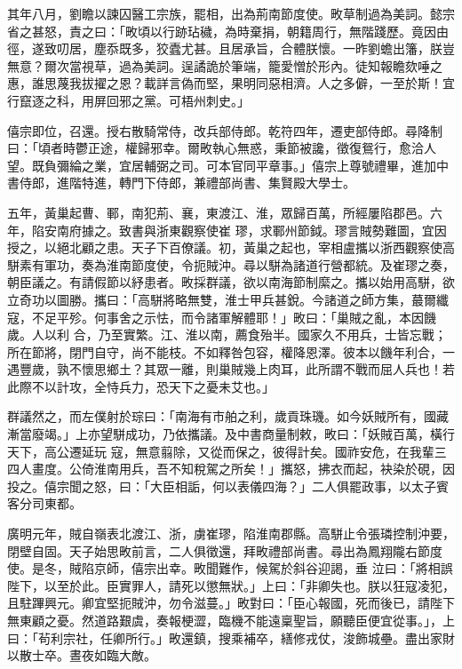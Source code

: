 \begin{pinyinscope}
 其年八月，劉瞻以諫囚醫工宗族，罷相，出為荊南節度使。畋草制過為美詞。懿宗省之甚怒，責之曰：「畋頃以行跡玷穢，為時棄捐，朝籍周行，無階踐歷。竟因由徑，遂致叨居，塵忝既多，狡蠹尤甚。且居承旨，合體朕懷。一昨劉蟾出籓，朕豈無意？爾次當視草，過為美詞。逞譎詭於筆端，籠愛憎於形內。徒知報瞻欬唾之惠，誰思蔑我拔擢之恩？載詳言偽而堅，果明同惡相濟。人之多僻，一至於斯！宜
 行竄逐之科，用屏回邪之黨。可梧州刺史。」



 僖宗即位，召還。授右散騎常侍，改兵部侍郎。乾符四年，遷吏部侍郎。尋降制曰：「頃者時鬱正途，權歸邪幸。爾畋執心無惑，秉節被讒，徵復鴛行，愈洽人望。既負彌綸之業，宜居輔弼之司。可本官同平章事。」僖宗上尊號禮畢，進加中書侍郎，進階特進，轉門下侍郎，兼禮部尚書、集賢殿大學士。



 五年，黃巢起曹、鄆，南犯荊、襄，東渡江、淮，眾歸百萬，所經屢陷郡邑。六年，陷安南府據之。致書與浙東觀察使崔
 璆，求鄆州節鉞。璆言賊勢難圖，宜因授之，以絕北顧之患。天子下百僚議。初，黃巢之起也，宰相盧攜以浙西觀察使高駢素有軍功，奏為淮南節度使，令扼賊沖。尋以駢為諸道行營都統。及崔璆之奏，朝臣議之。有請假節以紓患者。畋採群議，欲以南海節制縻之。攜以始用高駢，欲立奇功以圖勝。攜曰：「高駢將略無雙，淮士甲兵甚銳。今諸道之師方集，蕞爾纖寇，不足平殄。何事舍之示怯，而令諸軍解體耶！」畋曰：「巢賊之亂，本因饑歲。人以利
 合，乃至實繁。江、淮以南，薦食殆半。國家久不用兵，士皆忘戰；所在節將，閉門自守，尚不能枝。不如釋咎包容，權降恩澤。彼本以饑年利合，一遇豐歲，孰不懷思鄉土？其眾一離，則巢賊幾上肉耳，此所謂不戰而屈人兵也！若此際不以計攻，全恃兵力，恐天下之憂未艾也。」



 群議然之，而左僕射於琮曰：「南海有市舶之利，歲貢珠璣。如今妖賊所有，國藏漸當廢竭。」上亦望駢成功，乃依攜議。及中書商量制敕，畋曰：「妖賊百萬，橫行天下，高公遷延玩
 寇，無意翦除，又從而保之，彼得計矣。國祚安危，在我輩三四人畫度。公倚淮南用兵，吾不知稅駕之所矣！」攜怒，拂衣而起，袂染於硯，因投之。僖宗聞之怒，曰：「大臣相詬，何以表儀四海？」二人俱罷政事，以太子賓客分司東都。



 廣明元年，賊自嶺表北渡江、浙，虜崔璆，陷淮南郡縣。高駢止令張璘控制沖要，閉壁自固。天子始思畋前言，二人俱徵還，拜畋禮部尚書。尋出為鳳翔隴右節度使。是冬，賊陷京師，僖宗出幸。畋聞難作，候駕於斜谷迎謁，垂
 泣曰：「將相誤陛下，以至於此。臣實罪人，請死以懲無狀。」上曰：「非卿失也。朕以狂寇凌犯，且駐蹕興元。卿宜堅扼賊沖，勿令滋蔓。」畋對曰：「臣心報國，死而後已，請陛下無東顧之憂。然道路艱虞，奏報梗澀，臨機不能遠稟聖旨，願聽臣便宜從事。」，上曰：「茍利宗社，任卿所行。」畋還鎮，搜乘補卒，繕修戎仗，浚飾城壘。盡出家財以散士卒。晝夜如臨大敵。




\end{pinyinscope}
